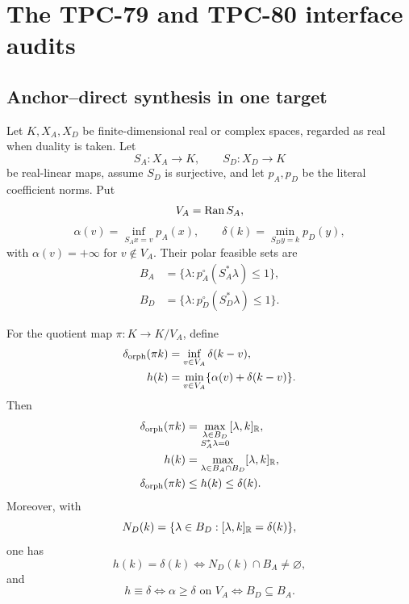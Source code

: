 \section{The TPC-79 and TPC-80 interface audits}
\label{sec:interface-audits}

\subsection{Anchor--direct synthesis in one target}

Let \(K,X_A,X_D\) be finite-dimensional real or complex spaces,
regarded as real when duality is taken.  Let
\[
 S_A:X_A\to K,\qquad S_D:X_D\to K
\]
be real-linear maps, assume \(S_D\) is surjective, and let
\(p_A,p_D\) be the literal coefficient norms.  Put
\[
 V_A=\operatorname{Ran} S_A,
\]
\[
 \alpha(v)=\inf_{S_Ax=v}p_A(x),\qquad
 \delta(k)=\min_{S_Dy=k}p_D(y),
\]
with \(\alpha(v)=+\infty\) for \(v\notin V_A\).  Their polar feasible
sets are
\begin{align}
 B_A&=\{\lambda:p_A^\circ(S_A^*\lambda)\le1\},\label{eq:BA-audit}\\
 B_D&=\{\lambda:p_D^\circ(S_D^*\lambda)\le1\}.\label{eq:BD-audit}
\end{align}

\begin{proposition}
\label{prop:tpc79-interface}
For the quotient map \(\pi:K\to K/V_A\), define
\begin{align}
 \delta_{\rm orph}(\pi k)
 &=\inf_{v\in V_A}\delta(k-v),\label{eq:orphan-audit}\\
 h(k)
 &=\min_{v\in V_A}\{\alpha(v)+\delta(k-v)\}.\label{eq:hybrid-audit}
\end{align}
Then
\begin{align}
 \delta_{\rm orph}(\pi k)
 &=\max_{\substack{\lambda\in B_D\\S_A^*\lambda=0}}
 [\lambda,k]_{\mathbb R},\label{eq:orphan-dual-audit}\\
 h(k)
 &=\max_{\lambda\in B_A\cap B_D}
 [\lambda,k]_{\mathbb R},\label{eq:hybrid-dual-audit}\\
 \delta_{\rm orph}(\pi k)&\le h(k)\le\delta(k).
\label{eq:three-gauges-audit}
\end{align}
Moreover, with
\[
 N_D(k)=\{\lambda\in B_D:[\lambda,k]_{\mathbb R}=\delta(k)\},
\]
one has
\begin{equation}
 h(k)=\delta(k)
 \iff N_D(k)\cap B_A\ne\varnothing,
\label{eq:fixed-equality-audit}
\end{equation}
and
\begin{equation}
 h\equiv\delta
 \iff \alpha\ge\delta\text{ on }V_A
 \iff B_D\subseteq B_A.
\label{eq:global-redundancy-audit}
\end{equation}
\end{proposition}

